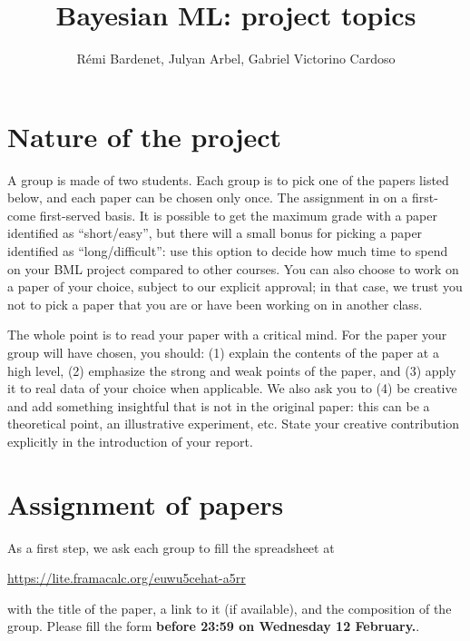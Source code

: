 \documentclass[12pt]{article}%
\begin{document}
\title{Bayesian ML: project topics}
\author{R\'emi Bardenet, Julyan Arbel, Gabriel Victorino Cardoso}
\maketitle

\section{Nature of the project}
A group is made of two students.
Each group is to pick one of the papers listed below, and each paper can be chosen only once.
The assignment in on a first-come first-served basis.
It is possible to get the maximum grade with a paper identified as ``short/easy'', but there will a small bonus for picking a paper identified as ``long/difficult'': use this option to decide how much time to spend on your BML project compared to other courses. 
You can also choose to work on a paper of your choice, subject to our explicit approval; in that case, we trust you not to pick a paper that you are or have been working on in another class.

The whole point is to read your paper with a critical mind. 
For the paper your group will have chosen, you should: (1) explain the contents of the paper at a high level, (2) emphasize the strong and weak points of the paper, and (3) apply it to real data of your choice when applicable. 
We also ask you to (4) be creative and add something insightful that is not in the original paper: this can be a theoretical point, an illustrative experiment, etc. 
State your creative contribution explicitly in the introduction of your report.

\section{Assignment of papers}
As a first step, we ask each group to fill the spreadsheet at
\begin{center}
   \href{https://lite.framacalc.org/euwu5cehat-a5rr}{https://lite.framacalc.org/euwu5cehat-a5rr}
 \end{center}
with the title of the paper, a link to it (if available), and the composition of the group.
Please fill the form {\bf before 23:59 on Wednesday 12 February.}. 
\end{document}
